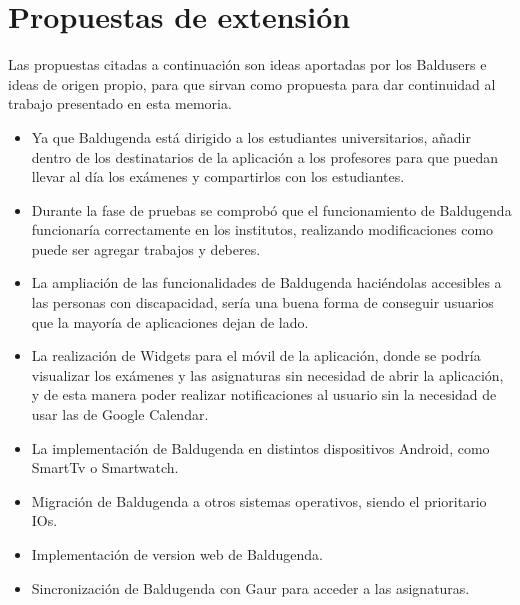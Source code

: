 \section{Propuestas de extensión}

Las propuestas citadas a continuación son ideas aportadas por los Baldusers e ideas de origen propio, para que sirvan como propuesta para dar continuidad al trabajo presentado en esta memoria. 
\begin{itemize}
	\item Ya que Baldugenda está dirigido a los estudiantes universitarios, añadir dentro de los destinatarios de la aplicación a los profesores para que puedan llevar al día los exámenes y compartirlos con los estudiantes.
	\item Durante la fase de pruebas se comprobó que el funcionamiento de Baldugenda funcionaría correctamente en los institutos, realizando modificaciones como puede ser agregar trabajos y deberes.
	\item La ampliación de las funcionalidades de Baldugenda haciéndolas accesibles a las personas con discapacidad, sería una buena forma de conseguir usuarios que la mayoría de aplicaciones dejan de lado.
	\item La realización de Widgets para el móvil de la aplicación, donde se podría visualizar los exámenes y las asignaturas sin necesidad de abrir la aplicación, y de esta manera poder realizar notificaciones al usuario sin la necesidad de usar las de Google Calendar.
	\item La implementación de Baldugenda en distintos dispositivos Android, como SmartTv o Smartwatch.
	\item Migración de Baldugenda a otros sistemas operativos, siendo el prioritario IOs.
	\item Implementación de version web de Baldugenda.
	\item Sincronización de Baldugenda con Gaur para acceder a las asignaturas.
\end{itemize}